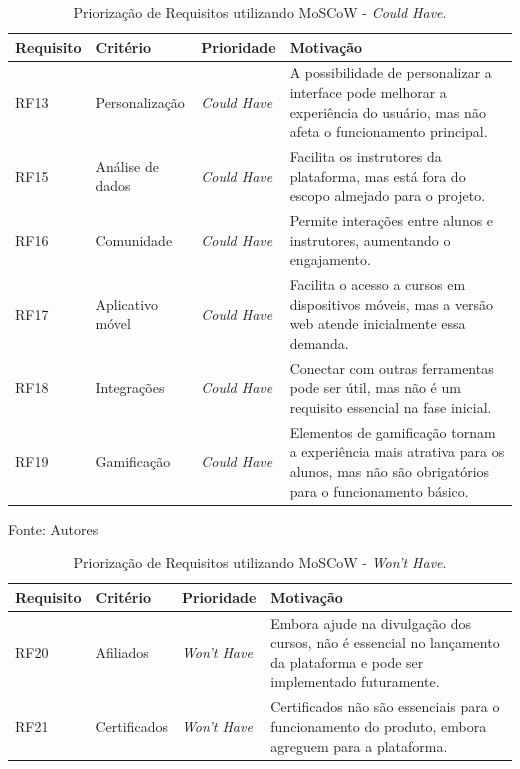 \begin{apendicesenv}
\begin{table}[h]
    \centering
    \caption{Priorização de Requisitos utilizando MoSCoW - \textit{Could Have}.}
    \label{tab:priorizacao_moscow3}
    \begin{adjustbox}{width=\textwidth}
        \begin{tabular}{|p{2.5cm}|p{5cm}|p{5cm}|p{4cm}|}
            \hline
            \textbf{Requisito} & \textbf{Critério} & \textbf{Prioridade} & \textbf{Motivação} \\
            \hline
            RF13 & Personalização & \textit{Could Have} & A possibilidade de personalizar a interface pode melhorar a experiência do usuário, mas não afeta o funcionamento principal. \\
            \hline
            RF15 & Análise de dados & \textit{Could Have} & Facilita os instrutores da plataforma, mas está fora do escopo almejado para o projeto. \\
            \hline
            RF16 & Comunidade & \textit{Could Have} & Permite interações entre alunos e instrutores, aumentando o engajamento. \\
            \hline
            RF17 & Aplicativo móvel & \textit{Could Have} & Facilita o acesso a cursos em dispositivos móveis, mas a versão web atende inicialmente essa demanda. \\
            \hline
            RF18 & Integrações & \textit{Could Have} & Conectar com outras ferramentas pode ser útil, mas não é um requisito essencial na fase inicial. \\
            \hline
            RF19 & Gamificação & \textit{Could Have} & Elementos de gamificação tornam a experiência mais atrativa para os alunos, mas não são obrigatórios para o funcionamento básico. \\
            \hline
        \end{tabular}
    \end{adjustbox}
    \vspace{5mm}
    {\footnotesize Fonte: Autores} 
\end{table}


\begin{table}[h]
    \centering
    \caption{Priorização de Requisitos utilizando MoSCoW - \textit{Won’t Have}.}
    \label{tab:priorizacao_moscow4}
    \begin{adjustbox}{width=\textwidth}
        \begin{tabular}{|p{2.5cm}|p{5cm}|p{5cm}|p{4cm}|}
            \hline
            \textbf{Requisito} & \textbf{Critério} & \textbf{Prioridade} & \textbf{Motivação} \\
            \hline
            RF20 & Afiliados & \textit{Won’t Have} & Embora ajude na divulgação dos cursos, não é essencial no lançamento da plataforma e pode ser implementado futuramente. \\
            \hline
            RF21 & Certificados & \textit{Won’t Have} & Certificados não são essenciais para o funcionamento do produto, embora agreguem para a plataforma. \\
            \hline
        \end{tabular}
    \end{adjustbox}


\end{table}
\end{apendicesenv}
